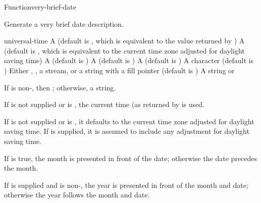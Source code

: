\documentclass[10pt,twoside,english,pdftex]{article}
\begin{document}
\begin{functiondoc}{Function}{very-brief-date}{%
    }
% 
% 

\fnsyntax

\fnpurpose Generate a very brief date description.

\fnpackage {}

\fnmodule {}

\fnargs
\begin{args}{universal-time}
 A  (default is \nil,
  which is equivalent to the value returned by
  )
 A  (default is \nil,
  which is equivalent to the current time zone adjusted for daylight
  saving time)
 A  (default is 
)
 A  (default is \nil)
 A  (default is )
\arg[separator] A character (default is \code{\#\bkslash/})
\arg[destination] Either \nil, , a stream, or a string with a fill 
pointer (default is \nil)
\arg[result] A string or \nil{}
\end{args}

\fnreturns If  is non-\nil, then \nil; otherwise, a string.

\fndescription
%
%
If  is not supplied or is \nil, the current time
(as returned by  is used.  

\W{} 
%
If  is not supplied or is \nil, it defaults to the current
time zone adjusted for daylight saving time. If  is
supplied, it is assumed to include any adjustment for daylight saving time.

\W{} 
%
If  is true, the month is presented in front of the
date; otherwise the date precedes the month.

\W{} 
%
If  is supplied and is non-\nil, the year is presented in
front of the month and date; otherwise the year follows the month and date.


\end{functiondoc}
\end{document}
